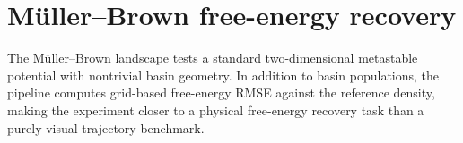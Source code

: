 \section{M\"uller--Brown free-energy recovery}
The M\"uller--Brown landscape tests a standard two-dimensional metastable potential with nontrivial basin geometry. In addition to basin populations, the pipeline computes grid-based free-energy RMSE against the reference density, making the experiment closer to a physical free-energy recovery task than a purely visual trajectory benchmark.
